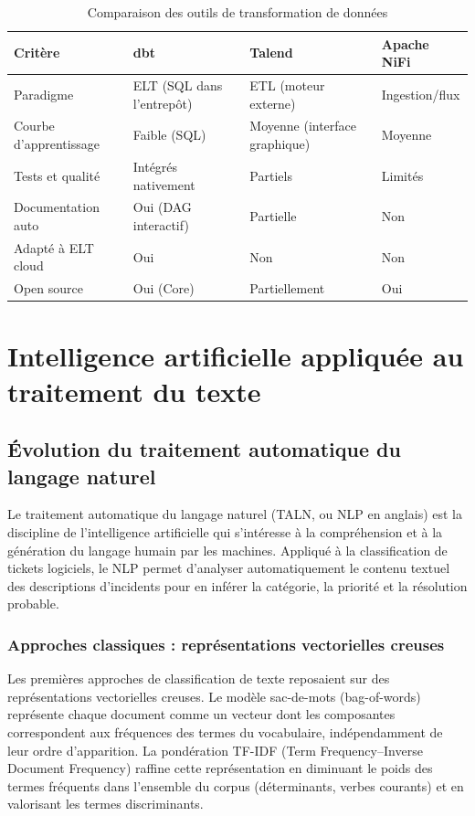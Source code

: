 \begin{table}[h!]
\centering
\begin{tabularx}{\textwidth}{|l|X|X|X|}
  \hline
  \textbf{Critère} & \textbf{dbt} & \textbf{Talend} & \textbf{Apache NiFi} \\
  \hline
  Paradigme & ELT (SQL dans l'entrepôt) & ETL (moteur externe) & Ingestion/flux \\
  \hline
  Courbe d'apprentissage & Faible (SQL) & Moyenne (interface graphique) & Moyenne \\
  \hline
  Tests et qualité & Intégrés nativement & Partiels & Limités \\
  \hline
  Documentation auto & Oui (DAG interactif) & Partielle & Non \\
  \hline
  Adapté à ELT cloud & Oui & Non & Non \\
  \hline
  Open source & Oui (Core) & Partiellement & Oui \\
  \hline
\end{tabularx}
\caption{Comparaison des outils de transformation de données}
\label{tab:comparatif_transformation}
\end{table}

\section{Intelligence artificielle appliquée au traitement du texte}

\subsection{Évolution du traitement automatique du langage naturel}

Le traitement automatique du langage naturel (TALN, ou NLP en anglais) est la discipline de l'intelligence artificielle qui s'intéresse à la compréhension et à la génération du langage humain par les machines. Appliqué à la classification de tickets logiciels, le NLP permet d'analyser automatiquement le contenu textuel des descriptions d'incidents pour en inférer la catégorie, la priorité et la résolution probable.

\subsubsection{Approches classiques : représentations vectorielles creuses}

Les premières approches de classification de texte reposaient sur des représentations vectorielles creuses. Le modèle sac-de-mots (bag-of-words) représente chaque document comme un vecteur dont les composantes correspondent aux fréquences des termes du vocabulaire, indépendamment de leur ordre d'apparition. La pondération TF-IDF (Term Frequency–Inverse Document Frequency) \cite{logo:tfidf} raffine cette représentation en diminuant le poids des termes fréquents dans l'ensemble du corpus (déterminants, verbes courants) et en valorisant les termes discriminants.

